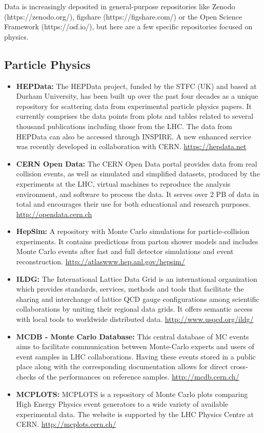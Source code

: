 Data is increasingly deposited in general-purpose repositories like
Zenodo (https://zenodo.org/), figshare (https://figshare.com/) or the
Open Science Framework (https://osf.io/), but here are a few specific
repositories focused on physics.
\subsection{Particle Physics}\label{databases:subsec:particlephysrep}

\begin{itemize}
\item
  \textbf{HEPData:} The HEPData project, funded by the STFC (UK) and
  based at Durham University, has been built up over the past four
  decades as a unique repository for scattering data from experimental
  particle physics papers. It currently comprises the data points from
  plots and tables related to several thousand publications including
  those from the LHC. The data from HEPData can also be accessed through
  INSPIRE. A new enhanced service was recently developed in
  collaboration with CERN. \url{https://hepdata.net}
\item
  \textbf{CERN Open Data:} The CERN Open Data portal provides data from
  real collision events, as well as simulated and simplified datasets,
  produced by the experiments at the LHC, virtual machines to reproduce
  the analysis environment, and software to process the data. It serves
  over 2 PB of data in total and encourages their use for both
  educational and research purposes. \url{http://opendata.cern.ch}
\item
  \textbf{HepSim:} A repository with Monte Carlo simulations for
  particle-collision experiments. It contains predictions from parton
  shower models and includes Monte Carlo events after fast and full
  detector simulations and event reconstruction.
  \url{http://atlaswww.hep.anl.gov/hepsim/}
\item
  \textbf{ILDG:} The International Lattice Data Grid is an international
  organization which provides standards, services, methods and tools
  that facilitate the sharing and interchange of lattice QCD gauge
  configurations among scientific collaborations by uniting their
  regional data grids. It offers semantic access with local tools to
  worldwide distributed data. \url{http://www.usqcd.org/ildg/}
\item
  \textbf{MCDB - Monte Carlo Database:} This central database of MC
  events aims to facilitate communication between Monte-Carlo experts
  and users of event samples in LHC collaborations. Having these events
  stored in a public place along with the corresponding documentation
  allows for direct cross-checks of the performances on reference
  samples. \url{http://mcdb.cern.ch/}
\item
  \textbf{MCPLOTS:} MCPLOTS is a repository of Monte Carlo plots
  comparing High Energy Physics event generators to a wide variety of
  available experimental data. The website is supported by the LHC
  Physics Centre at CERN. \url{http://mcplots.cern.ch/}
\end{itemize}

